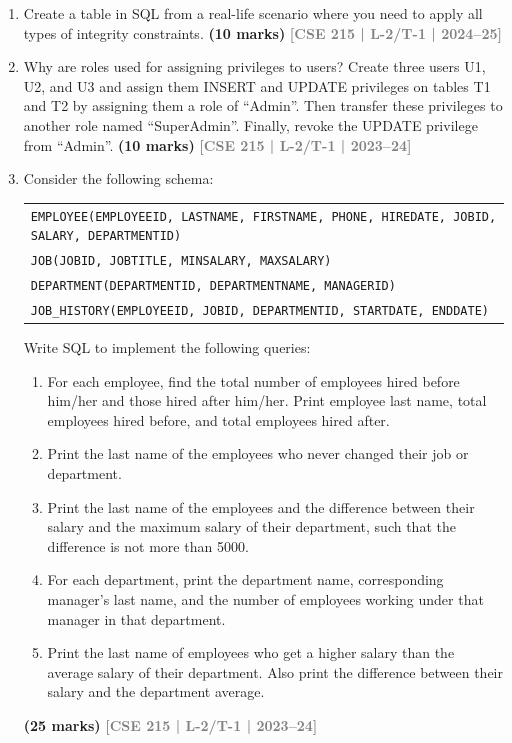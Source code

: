 \documentclass[12pt]{article}
\newcommand{\yr}[1]{\hfill\textcolor{gray}{\small\textbf{[#1]}}}
\newcommand{\mk}[1]{\textcolor{orange!70!black}{\small\textbf{(#1 marks)}}}
\begin{document}
\begin{enumerate}
\item Create a table in SQL from a real-life scenario where you need to apply all types of integrity constraints.
\mk{10} \yr{CSE 215 | L-2/T-1 | 2024--25}


\item Why are roles used for assigning privileges to users? Create three users U1, U2, and U3 and assign them INSERT and UPDATE privileges on tables T1 and T2 by assigning them a role of ``Admin''. Then transfer these privileges to another role named ``SuperAdmin''. Finally, revoke the UPDATE privilege from ``Admin''.
\mk{10} \yr{CSE 215 | L-2/T-1 | 2023--24}


\item Consider the following schema:
\begin{center}
\begin{tabular}{l}
\texttt{EMPLOYEE(EMPLOYEEID, LASTNAME, FIRSTNAME, PHONE, HIREDATE, JOBID, SALARY, DEPARTMENTID)}\\
\texttt{JOB(JOBID, JOBTITLE, MINSALARY, MAXSALARY)}\\
\texttt{DEPARTMENT(DEPARTMENTID, DEPARTMENTNAME, MANAGERID)}\\
\texttt{JOB\_HISTORY(EMPLOYEEID, JOBID, DEPARTMENTID, STARTDATE, ENDDATE)}
\end{tabular}
\end{center}
Write SQL to implement the following queries:
\begin{enumerate}
  \item For each employee, find the total number of employees hired before him/her and those hired after him/her. Print employee last name, total employees hired before, and total employees hired after.
  \item Print the last name of the employees who never changed their job or department.
  \item Print the last name of the employees and the difference between their salary and the maximum salary of their department, such that the difference is not more than 5000.
  \item For each department, print the department name, corresponding manager's last name, and the number of employees working under that manager in that department.
  \item Print the last name of employees who get a higher salary than the average salary of their department. Also print the difference between their salary and the department average.
\end{enumerate}
\mk{25} \yr{CSE 215 | L-2/T-1 | 2023--24}



\end{enumerate}
\end{document}
